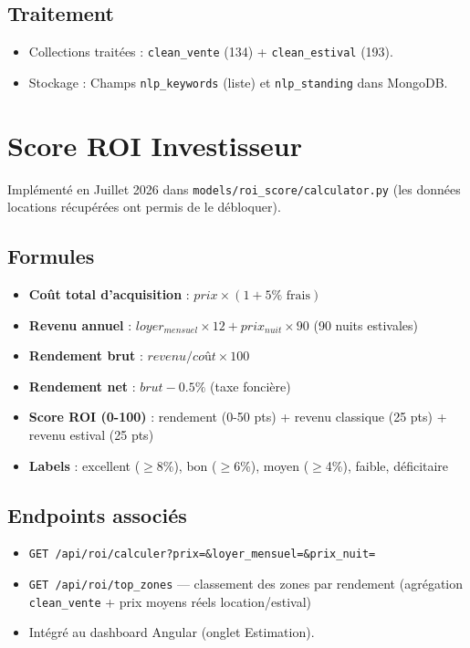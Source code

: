 \documentclass[12pt,a4paper]{report}
\begin{document}
\subsection{Traitement}
\begin{itemize}
    \item Collections traitées : \texttt{clean\_vente} (134) + \texttt{clean\_estival} (193).
    \item Stockage : Champs \texttt{nlp\_keywords} (liste) et \texttt{nlp\_standing} dans MongoDB.
\end{itemize}

\section{Score ROI Investisseur}

Implémenté en Juillet 2026 dans \texttt{models/roi\_score/calculator.py} (les données locations récupérées ont permis de le débloquer).

\subsection{Formules}
\begin{itemize}
    \item \textbf{Coût total d'acquisition} : $prix \times (1 + 5\% \text{ frais})$
    \item \textbf{Revenu annuel} : $loyer_{mensuel} \times 12 + prix_{nuit} \times 90$ (90 nuits estivales)
    \item \textbf{Rendement brut} : $revenu / coût \times 100$
    \item \textbf{Rendement net} : $brut - 0.5\%$ (taxe foncière)
    \item \textbf{Score ROI (0-100)} : rendement (0-50 pts) + revenu classique (25 pts) + revenu estival (25 pts)
    \item \textbf{Labels} : excellent ($\geq$8\%), bon ($\geq$6\%), moyen ($\geq$4\%), faible, déficitaire
\end{itemize}

\subsection{Endpoints associés}
\begin{itemize}
    \item \texttt{GET /api/roi/calculer?prix=\&loyer\_mensuel=\&prix\_nuit=}
    \item \texttt{GET /api/roi/top\_zones} — classement des zones par rendement (agrégation \texttt{clean\_vente} + prix moyens réels location/estival)
    \item Intégré au dashboard Angular (onglet Estimation).
\end{itemize}
\end{document}

